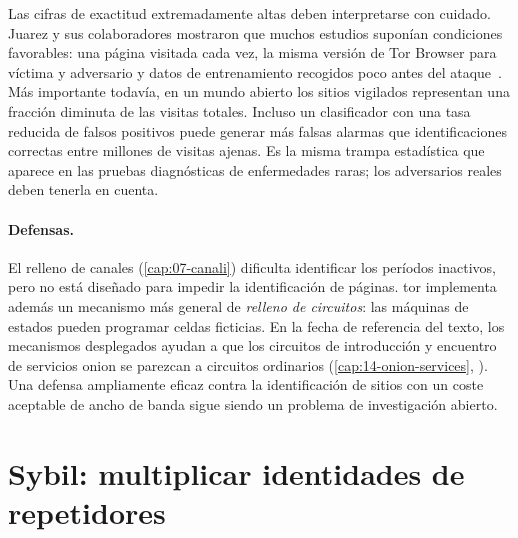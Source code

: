 \begin{approfondimento}
Las cifras de exactitud extremadamente altas deben interpretarse con cuidado. Juarez y sus colaboradores mostraron que muchos estudios suponían condiciones favorables: una página visitada cada vez, la misma versión de Tor Browser para víctima y adversario y datos de entrenamiento recogidos poco antes del ataque~\cite{juarez2014critical}. Más importante todavía, en un mundo abierto los sitios vigilados representan una fracción diminuta de las visitas totales. Incluso un clasificador con una tasa reducida de falsos positivos puede generar más falsas alarmas que identificaciones correctas entre millones de visitas ajenas. Es la misma trampa estadística que aparece en las pruebas diagnósticas de enfermedades raras; los adversarios reales deben tenerla en cuenta.
\end{approfondimento}

\paragraph{Defensas.} El relleno de canales (\cref{cap:07-canali}) dificulta identificar los períodos inactivos, pero no está diseñado para impedir la identificación de páginas. tor implementa además un mecanismo más general de \emph{relleno de circuitos}: las máquinas de estados pueden programar celdas ficticias. En la fecha de referencia del texto, los mecanismos desplegados ayudan a que los circuitos de introducción y encuentro de servicios onion se parezcan a circuitos ordinarios (\cref{cap:14-onion-services}, ). Una defensa ampliamente eficaz contra la identificación de sitios con un coste aceptable de ancho de banda sigue siendo un problema de investigación abierto.

\section{Sybil: multiplicar identidades de repetidores}\label{sec:att-sybil}

